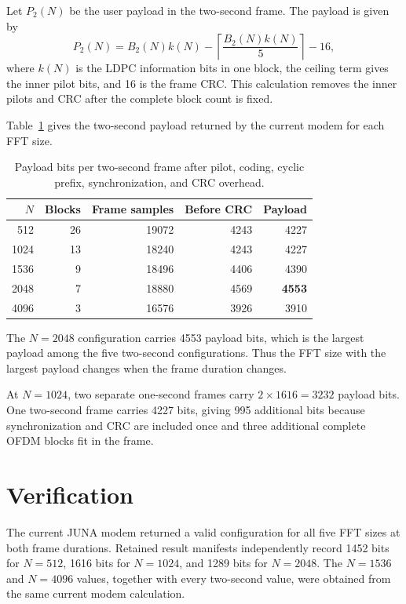 \documentclass[11pt]{article}
\begin{document}
Let $P_2(N)$ be the user payload in the two-second frame.  The payload is
given by
\begin{equation}
  P_2(N)
  =
  B_2(N)k(N)
  -\left\lceil\frac{B_2(N)k(N)}{5}\right\rceil
  -16,
  \label{eq:payload-two-seconds}
\end{equation}
where $k(N)$ is the LDPC information bits in one block, the ceiling term gives
the inner pilot bits, and 16 is the frame CRC.  This calculation removes the
inner pilots and CRC after the complete block count is fixed.

Table~\ref{tab:payload-two-seconds} gives the two-second payload returned by
the current modem for each FFT size.

\begin{table}[ht]
\centering
\caption{Payload bits per two-second frame after pilot, coding, cyclic prefix,
synchronization, and CRC overhead.}
\label{tab:payload-two-seconds}
\begin{tabular}{@{}rrrrr@{}}
\toprule
$N$ & Blocks & Frame samples & Before CRC & Payload \\
\midrule
 512 & 26 & 19072 & 4243 & 4227 \\
1024 & 13 & 18240 & 4243 & 4227 \\
1536 &  9 & 18496 & 4406 & 4390 \\
2048 &  7 & 18880 & 4569 & \textbf{4553} \\
4096 &  3 & 16576 & 3926 & 3910 \\
\bottomrule
\end{tabular}
\end{table}

The $N=2048$ configuration carries 4553 payload bits, which is the largest
payload among the five two-second configurations.  Thus the FFT size with the
largest payload changes when the frame duration changes.

At $N=1024$, two separate one-second frames carry $2\times1616=3232$ payload
bits.  One two-second frame carries 4227 bits, giving 995 additional bits
because synchronization and CRC are included once and three additional
complete OFDM blocks fit in the frame.

\section{Verification}

The current JUNA modem returned a valid configuration for all five FFT sizes
at both frame durations.  Retained result manifests independently record 1452 bits for
$N=512$, 1616 bits for $N=1024$, and 1289 bits for $N=2048$.  The $N=1536$
and $N=4096$ values, together with every two-second value, were obtained from
the same current modem calculation.
\end{document}

